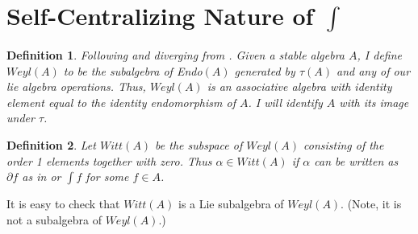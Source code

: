 \documentclass{artjlt}
\newtheorem{defn}{Definition}
\newcommand{\?}{\textbackslash}
\begin{document}
\section{Self-Centralizing Nature of $\int$}
\begin{defn}
Following \cite{pakianathan2010generalizedwittalgebrasvariable} and diverging from \cite{Dokovic1998}. Given a stable algebra $A$, I define $Weyl(A)$ to be the subalgebra
of Endo$(A)$ generated by $\tau(A)$ and any of our lie algebra operations. Thus,
$Weyl(A)$ is an associative algebra with identity element equal to 
the identity endomorphism of $A$. I will identify $A$ with its image under $\tau$.
\end{defn}
\begin{defn}
Let $Witt(A)$ be the subspace of $Weyl(A)$ consisting of the order 1 elements
together with zero. Thus $\alpha \in Witt(A)$ if $\alpha$ can be written
as $\partial f$ as in \cite{pakianathan2010generalizedwittalgebrasvariable} or $\int f$ for some $f \in A$. 
\end{defn}

It is easy to check that $Witt(A)$ is a Lie subalgebra of $Weyl(A)$. (Note,
it is not a subalgebra of $Weyl(A)$.)
\end{document}
